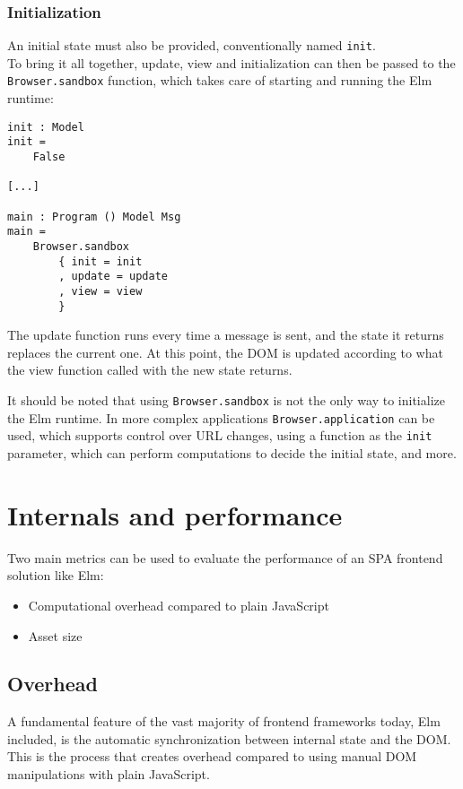 \subsubsection{Initialization}
An initial state must also be provided, conventionally named \texttt{init}.\\
To bring it all together, update, view and initialization can then be passed to the \texttt{Browser.sandbox} function, which takes care of starting and running the Elm runtime:
\begin{verbatim}
init : Model
init =
    False

[...]

main : Program () Model Msg
main =
    Browser.sandbox
        { init = init
        , update = update
        , view = view
        }
\end{verbatim}

The update function runs every time a message is sent, and the state it returns replaces the current one. At this point, the DOM is updated according to what the view function called with the new state returns.

It should be noted that using \texttt{Browser.sandbox} is not the only way to initialize the Elm runtime. In more complex applications \texttt{Browser.application} can be used, which supports control over URL changes, using a function as the \texttt{init} parameter, which can perform computations to decide the initial state, and more.

\section{Internals and performance}
Two main metrics can be used to evaluate the performance of an SPA frontend solution like Elm:
\begin{itemize}
    \item Computational overhead compared to plain JavaScript
    \item Asset size
\end{itemize}

\subsection{Overhead}
A fundamental feature of the vast majority of frontend frameworks today, Elm included, is the automatic synchronization between internal state and the DOM. This is the process that creates overhead compared to using manual DOM manipulations with plain JavaScript.\\

